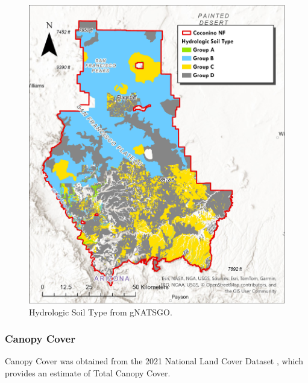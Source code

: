 \documentclass[
  number]{elsarticle}
\begin{document}
\begin{figure}[H]

{\centering \includegraphics{images/Hydrologic_soil_type.jpg}

}

\caption{Hydrologic Soil Type from gNATSGO.}

\end{figure}%

\subsubsection{Canopy Cover}\label{canopy-cover}

Canopy Cover was obtained from the 2021 National Land Cover Dataset ,
which provides an estimate of Total Canopy Cover.
\end{document}
